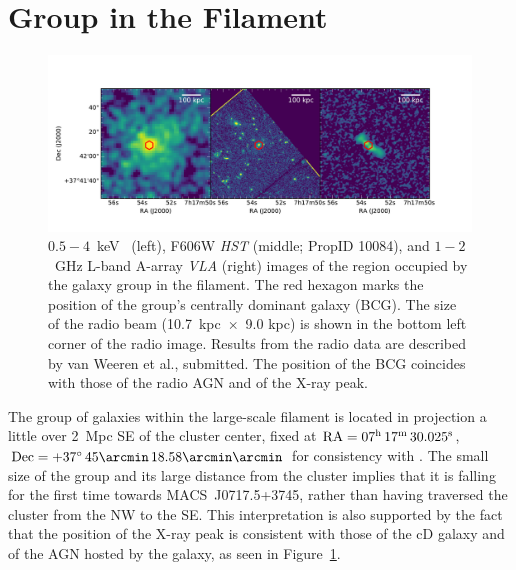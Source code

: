 \section{Group in the Filament}
\label{sec:Group}

\begin{figure}
	\includegraphics[width=\textwidth]{plots/group_bcg.pdf}
	\caption{$0.5-4$~keV  \chandra\ (left), F606W \emph{HST} (middle; PropID 10084), and $1-2$~GHz L-band A-array \emph{VLA} (right) images of the region occupied by the galaxy group in the filament. The red hexagon marks the position of the group's centrally dominant galaxy (BCG). The size of the radio beam (10.7~kpc~$\times$~9.0 kpc) is shown in the bottom left corner of the radio image. Results from the radio data are described by van Weeren et al., submitted. The position of the BCG coincides with those of the radio AGN and of the X-ray peak.\label{fig:group}}
\end{figure}

The group of galaxies within the large-scale filament is located in projection a little over 2~Mpc SE of the cluster center, fixed at ${\rm RA} = 07^{\rm h}\, 17^{\rm m}\, 30.025^{\rm s}$, ${\rm Dec} = +37^{\circ}\, 45\arcmin \, 18.58\arcmin\arcmin$ for consistency with \citet{Jauzac2012}. The small size of the group and its large distance from the cluster implies that it is falling for the first time towards MACS~J0717.5+3745, rather than having traversed the cluster from the NW to the SE. This interpretation is also supported by the fact that the position of the X-ray peak is consistent with those of the cD galaxy and of the AGN hosted by the galaxy, as seen in Figure~\ref{fig:group}.

